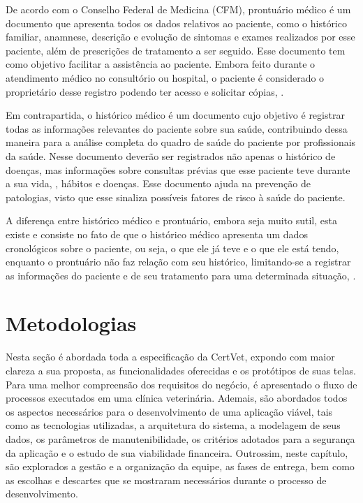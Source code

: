 \documentclass[
    12pt,               %
    openright,          %
    oneside,
    a4paper,            %
    BIBLATEX,           %
    TODO,               %
    english,            %
    brazil              %
    ]{ifsp-spo-inf-ctds}
\begin{document}
    De acordo com o Conselho Federal de Medicina (CFM), prontuário médico é um documento que apresenta todos os dados relativos ao paciente, como o histórico familiar, anamnese, descrição e evolução de sintomas e exames realizados por esse paciente, além de prescrições de tratamento a ser seguido. Esse documento tem como objetivo facilitar a assistência ao paciente. Embora feito durante o atendimento médico no consultório ou hospital, o paciente é considerado o proprietário desse registro podendo ter acesso e solicitar cópias, .


    Em contrapartida, o histórico médico é um documento cujo objetivo é registrar todas as informações relevantes do paciente sobre sua saúde, contribuindo dessa maneira para a análise completa do quadro de saúde do paciente por profissionais da saúde. Nesse documento deverão ser registrados não apenas o histórico de doenças, mas informações sobre consultas prévias que esse paciente teve durante a sua vida, , hábitos e doenças. Esse documento ajuda na prevenção de patologias, visto que esse sinaliza possíveis fatores de risco à saúde do paciente. %

    A diferença entre histórico médico e prontuário, embora seja muito sutil, esta existe e consiste no fato de que o histórico médico apresenta um dados cronológicos sobre o paciente, ou seja, o que ele já teve e o que ele está tendo, enquanto o prontuário não faz relação com seu histórico, limitando-se a registrar as informações do paciente e de seu tratamento para uma determinada situação, . 

\chapter[Metodologias]{Metodologias}

    Nesta seção é abordada toda a especificação da CertVet, expondo com maior clareza a sua proposta, as funcionalidades oferecidas e os protótipos de suas telas. Para uma melhor compreensão dos requisitos do negócio, é apresentado o fluxo de processos executados em uma clínica veterinária. Ademais, são abordados todos os aspectos necessários para o desenvolvimento de uma aplicação viável, tais como as tecnologias utilizadas, a arquitetura do sistema, a modelagem de seus dados, os parâmetros de manutenibilidade, os critérios adotados para a segurança da aplicação e o estudo de sua viabilidade financeira. Outrossim, neste capítulo, são explorados a gestão e a organização da equipe, as fases de entrega, bem como as escolhas e descartes que se mostraram necessários durante o processo de desenvolvimento.
\end{document}
